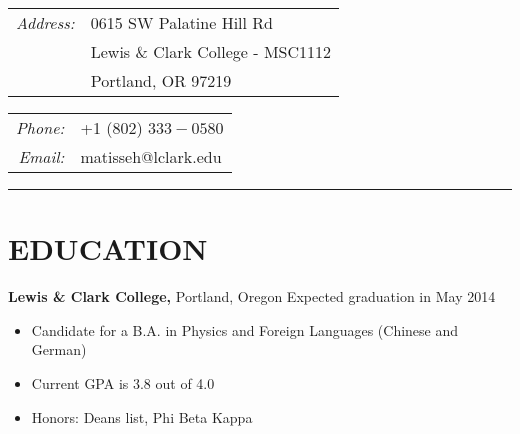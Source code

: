 \documentclass{res} %
\begin{document}
\begin{resume}

\sectionwidth=0pt

\partopsep 0pt
\parsep 0.5pt
\parskip 8pt
\itemsep 0pt
\parindent 7pt

\begin{multicols}{2}

\begin{tabular}{r l}
{\it Address:} & 0615 SW Palatine Hill Rd \\
& Lewis \& Clark College - MSC1112 \\
& Portland, OR 97219 \\
\end{tabular}

\columnbreak

\begin{tabular}{r l}
{\it Phone:} & +1 (802) $333-0580$ \\
{\it Email:} & matisseh@lclark.edu
\end{tabular}

\end{multicols}

\hrule width 7in height 1pt

\section{EDUCATION}

{\bf Lewis \& Clark College,} Portland, Oregon \hfill Expected graduation in May 2014 %
\begin{itemize}[label={--}]
	\item Candidate for a B.A. in Physics and Foreign Languages (Chinese and German)
	\item Current GPA is 3.8 out of 4.0
	\item Honors: Deans list, Phi Beta Kappa
\end{itemize}



\end{resume}
\end{document}

